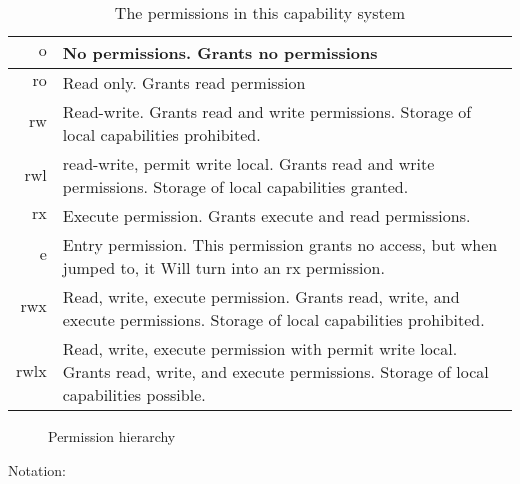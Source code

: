 \documentclass{article}
\newcommand{\plainperm}[1]{\mathrm{#1}}
\newcommand{\noperm}{\plainperm{o}}
\newcommand{\readonly}{\plainperm{ro}}
\newcommand{\readwrite}{\plainperm{rw}}
\newcommand{\exec}{\plainperm{rx}}
\newcommand{\entry}{\plainperm{e}}
\newcommand{\rwx}{\plainperm{rwx}}
\newcommand{\readwritel}{\plainperm{rwl}}
\newcommand{\rwlx}{\plainperm{rwlx}}
\begin{document}
\begin{table}[!h]
  \centering
  \begin{tabular}[!h]{r |  p{7cm} }
  $\noperm$ & No permissions. Grants no permissions\\
\hline
  $\readonly$ & Read only. Grants read permission \\
\hline
  $\readwrite$ & Read-write. Grants read and write permissions. Storage of local capabilities prohibited. \\
\hline
  $\readwritel$ & read-write, permit write local. Grants read and write permissions. Storage of local capabilities granted. \\
\hline
  $\exec$ & Execute permission. Grants execute and read permissions.\\
\hline
  $\entry$ & Entry permission. This permission grants no access, but when jumped to, it Will turn into an $\exec$ permission.\\
\hline
  $\rwx$ & Read, write, execute permission. Grants read, write, and execute permissions. Storage of local capabilities prohibited. \\
\hline
  $\rwlx$ & Read, write, execute permission with permit write local. Grants read, write, and execute permissions. Storage of local capabilities possible.
\end{tabular}

\caption{The permissions in this capability system}
\label{tab:permission-list}
\end{table}
\begin{figure}[!h]
  \centering

\caption{Permission hierarchy}
\label{fig:perm-hier}
\end{figure}
Notation:
\end{document}
